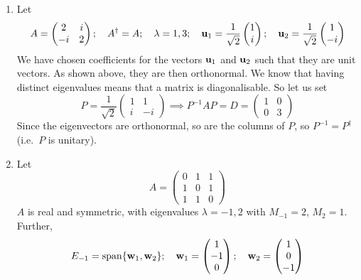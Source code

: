 \begin{enumerate}
	\item Let
	      \[
		      A = \begin{pmatrix}
			      2 & i \\ -i & 2
		      \end{pmatrix};\quad A^\dagger = A;\quad \lambda = 1, 3;\quad\vb u_1 = \frac{1}{\sqrt{2}} \begin{pmatrix}
			      1 \\i
		      \end{pmatrix};\quad\vb u_2 = \frac{1}{\sqrt{2}} \begin{pmatrix}
			      1 \\-i
		      \end{pmatrix}
	      \]
	      We have chosen coefficients for the vectors \(\vb u_1\) and \(\vb u_2\) such that they are unit vectors.
	      As shown above, they are then orthonormal.
	      We know that having distinct eigenvalues means that a matrix is diagonalisable.
	      So let us set
	      \[
		      P =  \frac{1}{\sqrt{2}} \begin{pmatrix}
			      1 & 1 \\ i & -i
		      \end{pmatrix} \implies P^{-1}AP = D = \begin{pmatrix}
			      1 & 0 \\ 0 & 3
		      \end{pmatrix}
	      \]
	      Since the eigenvectors are orthonormal, so are the columns of \(P\), so \(P^{-1} = P^\dagger\) (i.e.\ \(P\) is unitary).
	\item Let
	      \[
		      A = \begin{pmatrix}
			      0 & 1 & 1 \\ 1 & 0 & 1 \\ 1 & 1 & 0
		      \end{pmatrix}
	      \]
	      \(A\) is real and symmetric, with eigenvalues \(\lambda = -1, 2\) with \(M_{-1} = 2\), \(M_2 = 1\).
	      Further,
	      \[
		      E_{-1} = \operatorname{span} \{ \vb w_1, \vb w_2 \};\quad \vb w_1 = \begin{pmatrix}
			      1 \\ -1 \\ 0
		      \end{pmatrix};\quad \vb w_2 = \begin{pmatrix}
			      1 \\ 0 \\ -1
		      \end{pmatrix}
	      \]

\end{enumerate}
